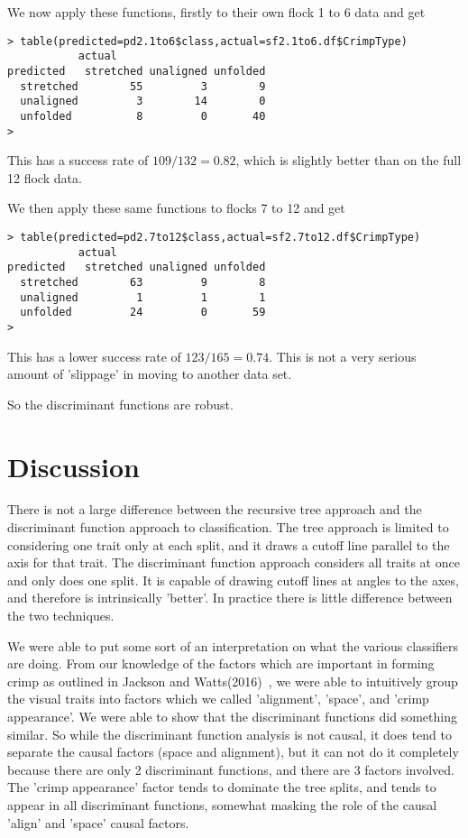 \documentclass[titlepage]{article}  %
\begin{document}
 We now apply these functions, firstly to their own flock 1 to 6 data and get
\begin{verbatim}
> table(predicted=pd2.1to6$class,actual=sf2.1to6.df$CrimpType)
           actual
predicted   stretched unaligned unfolded
  stretched        55         3        9
  unaligned         3        14        0
  unfolded          8         0       40
> 
\end{verbatim}
This has a success rate of $109/132=0.82$, which is slightly better than on the full 12 flock data. 

We then apply these same functions to flocks 7 to 12 and get
\begin{verbatim}
> table(predicted=pd2.7to12$class,actual=sf2.7to12.df$CrimpType)
           actual
predicted   stretched unaligned unfolded
  stretched        63         9        8
  unaligned         1         1        1
  unfolded         24         0       59
> 
\end{verbatim}
This has a lower success rate of $123/165=0.74$. This is not a very serious amount of 'slippage' in moving to another data set. 

So the discriminant functions are robust.

\section{Discussion}
There is not a large difference between the recursive tree approach and the discriminant function approach to classification. The tree approach is limited to considering one trait only at each split, and it draws a cutoff line parallel to the axis for that trait. The discriminant function approach considers all traits at once and only does one split. It is capable of drawing cutoff lines at angles to the axes, and therefore is intrinsically 'better'. In practice there is  little difference between the two techniques.

We were able to put some sort of an interpretation on what the various classifiers are doing. From our knowledge of the factors which are important in forming crimp as outlined in Jackson and Watts(2016)~\cite{jack:16}, we were able to intuitively group the visual traits into factors which we called 'alignment', 'space', and 'crimp appearance'. We were able to show that the discriminant functions did something similar. So while the discriminant function analysis is not causal, it does tend to separate the causal factors (space and alignment), but it can not do it completely because there are only 2 discriminant functions, and there are 3 factors involved. The 'crimp appearance' factor tends to  dominate the tree splits, and tends to appear in all discriminant functions, somewhat masking the role of the causal 'align' and 'space' causal factors.
\end{document}
